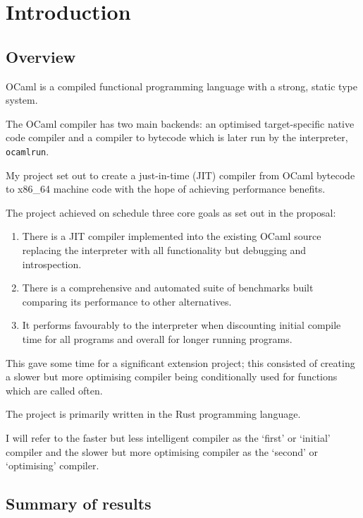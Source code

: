 \chapter{Introduction}

\section{Overview}

OCaml is a compiled functional programming language with a strong, static type system.

The OCaml compiler has two main backends: an optimised target-specific native code compiler and a
compiler to bytecode which is later run by the interpreter, \texttt{ocamlrun}.

My project set out to create a just-in-time (JIT) compiler from OCaml bytecode to x86\_64 machine
code with the hope of achieving performance benefits.

The project achieved on schedule three core goals as set out in the proposal:

\begin{enumerate}
      \item There is a JIT compiler implemented into the existing OCaml source
            replacing the interpreter with all functionality but debugging
            and introspection.
      \item There is a comprehensive and automated suite of benchmarks built
            comparing its performance to other alternatives.
      \item It performs favourably to the interpreter when discounting
            initial compile time for all programs and overall for longer running
            programs.
\end{enumerate}

This gave some time for a significant extension project; this consisted of creating a slower but
more optimising compiler being conditionally used for functions which are called often.

The project is primarily written in the Rust programming language.

I will refer to the faster but less intelligent compiler as the `first' or `initial' compiler and
the slower but more optimising compiler as the `second' or `optimising' compiler.

\section{Summary of results}

